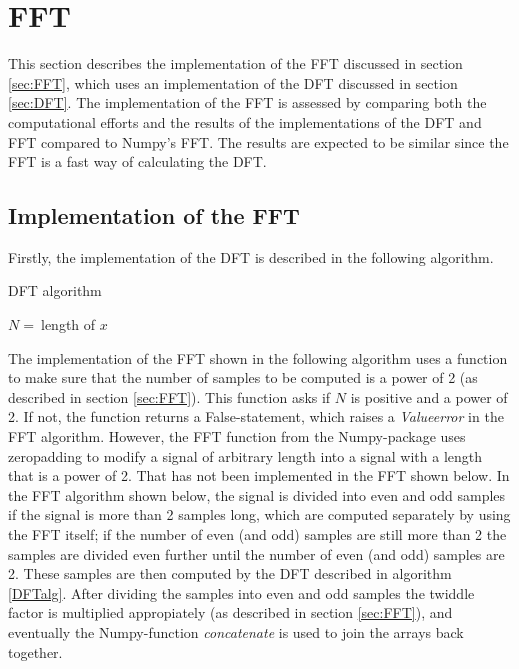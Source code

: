 \section{FFT}
This section describes the implementation of the FFT discussed in section \ref{sec:FFT}, which uses an implementation of the DFT discussed in section \ref{sec:DFT}. The implementation of the FFT is assessed by comparing both the computational efforts and the results of the implementations of the DFT and FFT compared to Numpy's FFT. The results are expected to be similar since the FFT is a fast way of calculating the DFT.

\subsection{Implementation of the FFT}
Firstly, the implementation of the DFT is described in the following algorithm.
\begin{algorithm}
\caption{DFT algorithm}
\label{DFTalg}
\begin{algorithmic}[1]
\State $N = \ $length of $x$ 
		 
		\EndFor
	\EndFor
\EndProcedure
\end{algorithmic}
\end{algorithm}

The implementation of the FFT shown in the following algorithm uses a function to make sure that the number of samples to be computed is a power of 2 (as described in section \ref{sec:FFT}). This function asks if $N$ is positive and a power of 2. If not, the function returns a False-statement, which raises a \textit{Valueerror} in the FFT algorithm. However, the FFT function from the Numpy-package uses zeropadding to modify a signal of arbitrary length into a signal with a length that is a power of 2. That has not been implemented in the FFT shown below. In the FFT algorithm shown below, the signal is divided into even and odd samples if the signal is more than 2 samples long, which are computed separately by using the FFT itself; if the number of even (and odd) samples are still more than 2 the samples are divided even further until the number of even (and odd) samples are 2. These samples are then computed by the DFT described in algorithm \ref{DFTalg}. After dividing the samples into even and odd samples the twiddle factor is multiplied appropiately (as described in section \ref{sec:FFT}), and eventually the Numpy-function \textit{concatenate} is used to join the arrays back together.

